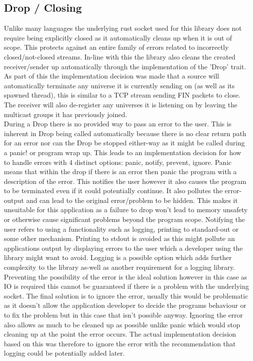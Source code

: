 \documentclass[11pt,a4paper]{report}
\begin{document}
\subsection{Drop / Closing}
Unlike many languages the underlying rust socket used for this library does not require being explicitly closed as it automatically cleans up when it is out of scope. This protects against an entire family of errors related to incorrectly closed/not-closed streams. In-line with this the library also cleans the created receiver/sender up automatically through the implementation of the 'Drop' trait. As part of this the implementation decision was made that a source will automatically terminate any universe it is currently sending on (as well as its spawned thread), this is similar to a TCP stream sending FIN packets to close. The receiver will also de-register any universes it is listening on by leaving the multicast groups it has previously joined. \\

During a Drop there is no provided way to pass an error to the user. This is inherent in Drop being called automatically because there is no clear return path for an error nor can the Drop be stopped either-way as it might be called during a panic! or program wrap up. This leads to an implementation decision for how to handle errors with 4 distinct options: panic, notify, prevent, ignore. Panic means that within the drop if there is an error then panic the program with a description of the error. This notifies the user however it also causes the program to be terminated even if it could potentially continue. It also pollutes the error-output and can lead to the original error/problem to be hidden. This makes it unsuitable for this application as a failure to drop won't lead to memory unsafety or otherwise cause significant problems beyond the program scope. Notifying the user refers to using a functionality such as logging, printing to standard-out or some other mechanism. Printing to stdout is avoided as this might pollute an applications output by displaying errors to the user which a developer using the library might want to avoid. Logging is a possible option which adds further complexity to the library as-well as another requirement for a logging library. Preventing the possibility of the error is the ideal solution however in this case as IO is required this cannot be guaranteed if there is a problem with the underlying socket. The final solution is to ignore the error, usually this would be problematic as it doesn't allow the application developer to decide the programs behaviour or to fix the problem but in this case that isn't possible anyway. Ignoring the error also allows as much to be cleaned up as possible unlike panic which would stop cleaning up at the point the error occurs. The actual implementation decision based on this was therefore to ignore the error with the recommendation that logging could be potentially added later.
\end{document}
